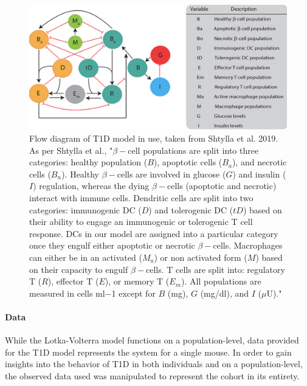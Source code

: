 \begin{figure}[H]
    \centering
    \includegraphics[width=15cm]{Model_Setup_Images/T1Dflowdiag.png}
    \caption{Flow diagram of T1D model in use, taken from Shtylla et al. 2019. As per Shtylla et al., "$\beta-$cell populations are split into three categories: healthy population ($B$), apoptotic cells ($B_{a}$), and necrotic cells ($B_{n}$). Healthy $\beta-$cells are involved in glucose ($G$) and insulin ($I$) regulation, whereas the dying $\beta-$cells (apoptotic and necrotic) interact with immune cells. Dendritic cells are split into two categories: immunogenic DC ($D$) and tolerogenic DC ($tD$) based on their ability to engage an immunogenic or tolerogenic T cell response. DCs in our model are assigned into a particular category once they engulf either apoptotic or necrotic $\beta-$cells. Macrophages can either be in an activated ($M_{a}$) or non activated form ($M$) based on their capacity to engulf $\beta-$cells. T cells are split into: regulatory T ($R$), effector T ($E$), or memory T ($E_{m}$). All populations are measured in cells ml−1 except for $B$ (mg), $G$ (mg/dl), and $I$ ($\mu$U)." \cite{shtylla2019mathematical}}
    \label{fig:flowdiag}
\end{figure}

\paragraph{Data}
While the Lotka-Volterra model functions on a population-level, data provided for the T1D model represents the system for a single mouse. In order to gain insights into the behavior of T1D in both individuals and on a population-level, the observed data used was manipulated to represent the cohort in its entirety. 

